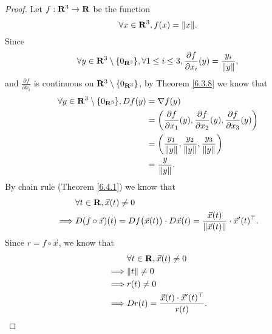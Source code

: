 \begin{proof}
    Let \(f : \R^3 \to \R\) be the function
    \[
        \forall x \in \R^3, f(x) = \norm*{x}.
    \]
    Since
    \[
        \forall y \in \R^3 \setminus \{0_{\R^3}\}, \forall 1 \leq i \leq 3, \frac{\partial f}{\partial x_i}(y) = \frac{y_i}{\norm*{y}},
    \]
    and \(\frac{\partial f}{\partial x_i}\) is continuous on \(\R^3 \setminus \{0_{\R^3}\}\), by Theorem \ref{6.3.8} we know that
    \begin{align*}
        \forall y \in \R^3 \setminus \{0_{\R^3}\}, D f(y) & = \nabla f(y)                                                                                                            \\
                                                          & = \bigg(\frac{\partial f}{\partial x_1}(y), \frac{\partial f}{\partial x_2}(y), \frac{\partial f}{\partial x_3}(y)\bigg) \\
                                                          & = \bigg(\frac{y_1}{\norm*{y}}, \frac{y_2}{\norm*{y}}, \frac{y_3}{\norm*{y}}\bigg)                                        \\
                                                          & = \frac{y}{\norm*{y}}.
    \end{align*}
    By chain rule (Theorem \ref{6.4.1}) we know that
    \begin{align*}
                 & \forall t \in \R, \vec{x}(t) \neq 0                                                                                                 \\
        \implies & D (f \circ \vec{x})(t) = D f\big(\vec{x}(t)\big) \cdot D \vec{x}(t) = \frac{\vec{x}(t)}{\norm*{\vec{x}(t)}} \cdot \vec{x}'(t)^\top.
    \end{align*}
    Since \(r = f \circ \vec{x}\), we know that
    \begin{align*}
                 & \forall t \in \R, \vec{x}(t) \neq 0                      \\
        \implies & \norm*{t} \neq 0                                         \\
        \implies & r(t) \neq 0                                              \\
        \implies & D r(t) = \frac{\vec{x}(t) \cdot \vec{x}'(t)^\top}{r(t)}.
    \end{align*}
\end{proof}